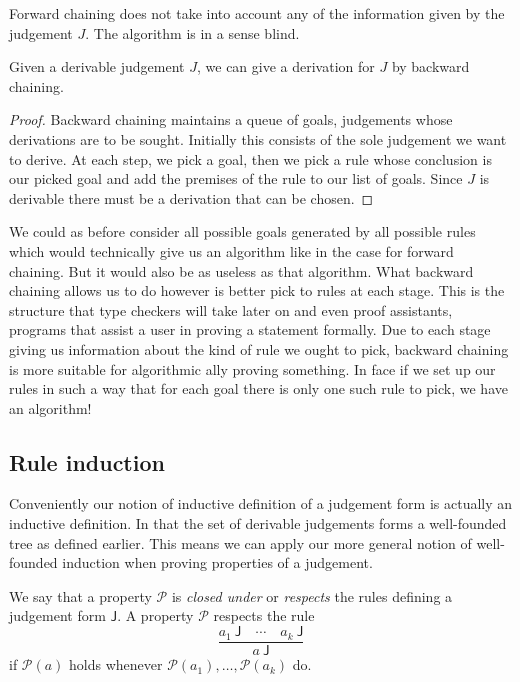 Forward chaining does not take into account any of the information given by the judgement $J$. The algorithm is in a sense blind. 

\begin{lemma}
    Given a derivable judgement $J$, we can give a derivation for $J$ by backward chaining.
\end{lemma}

\begin{proof}
    Backward chaining maintains a queue of goals, judgements whose derivations are to be sought. Initially this consists of the sole judgement we want to derive. At each step, we pick a goal, then we pick a rule whose conclusion is our picked goal and add the premises of the rule to our list of goals. Since $J$ is derivable there must be a derivation that can be chosen.
\end{proof}

\begin{remark}
    We could as before consider all possible goals generated by all possible rules which would technically give us an algorithm like in the case for forward chaining. But it would also be as useless as that algorithm. What backward chaining allows us to do however is better pick to rules at each stage. This is the structure that type checkers will take later on and even proof assistants, programs that assist a user in proving a statement formally. Due to each stage giving us information about the kind of rule we ought to pick, backward chaining is more suitable for algorithmic ally proving something. In face if we set up our rules in such a way that for each goal there is only one such rule to pick, we have an algorithm!
\end{remark}

\subsection{Rule induction}

Conveniently our notion of inductive definition of a judgement form is actually an inductive definition. In that the set of derivable judgements forms a well-founded tree as defined earlier. This means we can apply our more general notion of well-founded induction when proving properties of a judgement.

\begin{defin}
    We say that a property $\mathcal{P}$ is \emph{closed under} or \emph{respects} the rules defining a judgement form $\mathsf{J}$. A property $\mathcal{P}$ respects the rule
    $$
        \frac
        {a_1\ \mathsf{J}\quad \cdots \quad a_k\ \mathsf{J}}
        {a \ \mathsf{J}}
    $$
    if $\mathcal{P}(a)$ holds whenever $\mathcal{P}(a_1), \dots, \mathcal{P}(a_k)$ do.
\end{defin}


